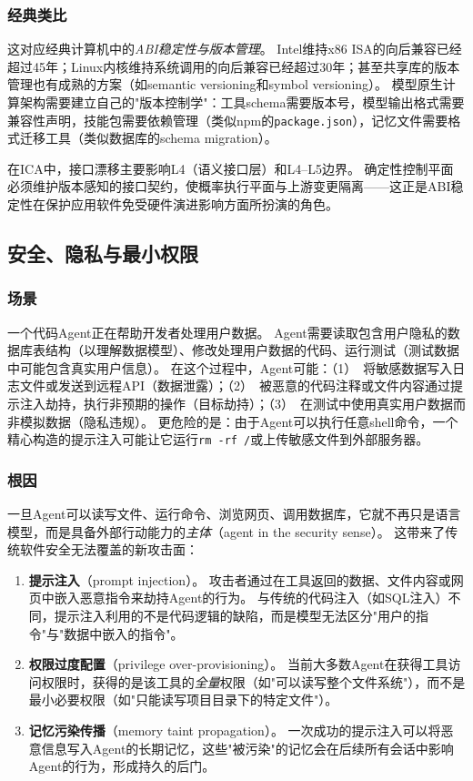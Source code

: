 \subsubsection{经典类比}
这对应经典计算机中的\emph{ABI稳定性与版本管理}。
Intel维持x86 ISA的向后兼容已经超过45年；Linux内核维持系统调用的向后兼容已经超过30年；甚至共享库的版本管理也有成熟的方案（如semantic versioning和symbol versioning）。
模型原生计算架构需要建立自己的"版本控制学"：工具schema需要版本号，模型输出格式需要兼容性声明，技能包需要依赖管理（类似npm的\texttt{package.json}），记忆文件需要格式迁移工具（类似数据库的schema migration）。

在ICA中，接口漂移主要影响L4（语义接口层）和L4--L5边界。
确定性控制平面必须维护版本感知的接口契约，使概率执行平面与上游变更隔离——这正是ABI稳定性在保护应用软件免受硬件演进影响方面所扮演的角色。


\subsection{安全、隐私与最小权限}

\subsubsection{场景}
一个代码Agent正在帮助开发者处理用户数据。
Agent需要读取包含用户隐私的数据库表结构（以理解数据模型）、修改处理用户数据的代码、运行测试（测试数据中可能包含真实用户信息）。
在这个过程中，Agent可能：（1）~将敏感数据写入日志文件或发送到远程API（数据泄露）；（2）~被恶意的代码注释或文件内容通过提示注入劫持，执行非预期的操作（目标劫持）；（3）~在测试中使用真实用户数据而非模拟数据（隐私违规）。
更危险的是：由于Agent可以执行任意shell命令，一个精心构造的提示注入可能让它运行\texttt{rm -rf /}或上传敏感文件到外部服务器。

\subsubsection{根因}
一旦Agent可以读写文件、运行命令、浏览网页、调用数据库，它就不再只是语言模型，而是具备外部行动能力的\emph{主体}（agent in the security sense）。
这带来了传统软件安全无法覆盖的新攻击面：

\begin{enumerate}[nosep]
\item \textbf{提示注入}（prompt injection）。
攻击者通过在工具返回的数据、文件内容或网页中嵌入恶意指令来劫持Agent的行为。
与传统的代码注入（如SQL注入）不同，提示注入利用的不是代码逻辑的缺陷，而是模型无法区分"用户的指令"与"数据中嵌入的指令"\cite{debenedetti2025camel,owasp_agentic2026}。

\item \textbf{权限过度配置}（privilege over-provisioning）。
当前大多数Agent在获得工具访问权限时，获得的是该工具的\emph{全量}权限（如"可以读写整个文件系统"），而不是最小必要权限（如"只能读写项目目录下的特定文件"）。

\item \textbf{记忆污染传播}（memory taint propagation）。
一次成功的提示注入可以将恶意信息写入Agent的长期记忆，这些"被污染"的记忆会在后续所有会话中影响Agent的行为，形成持久的后门\cite{aura2025}。
\end{enumerate}

